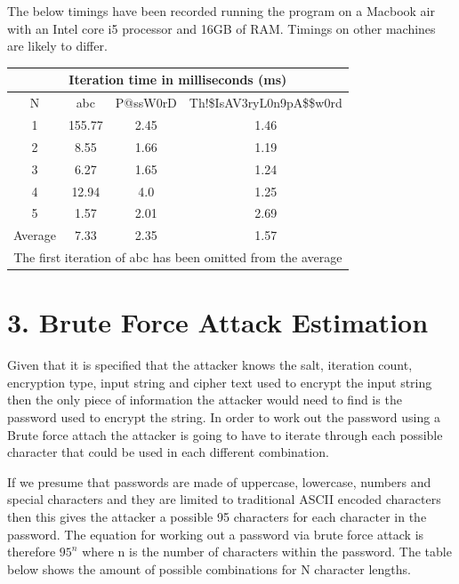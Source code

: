\documentclass[a4paper, twoside, 11pt]{article}
\begin{document}
 The below timings have been recorded running the program on a Macbook air with an Intel core i5 processor and 16GB of RAM.
  Timings on other machines are likely to differ.
 \begin{center}
	\begin{tabular}{ |c|c|c|c| } 
	 \hline
	 \multicolumn{4}{|c|}{Iteration time in milliseconds (ms)} \\
	 \hline
	 N & abc & P@ssW0rD & Th!\$IsAV3ryL0n9pA\$\$w0rd \\
	 \hline
	 1 & 155.77 & 2.45 & 1.46 \\ 
	 2 & 8.55 & 1.66 & 1.19  \\ 
	 3 & 6.27 & 1.65 & 1.24  \\ 
	 4 & 12.94 & 4.0 & 1.25 \\
	 5 & 1.57 & 2.01 & 2.69  \\
	 \hline
	 \hline
	 Average & 7.33 & 2.35 & 1.57  \\
	 \hline
	 \multicolumn{4}{|c|}{The first iteration of abc has been omitted from the average} \\
	 \hline
	\end{tabular}
\end{center}

\section*{3. Brute Force Attack Estimation}
Given that it is specified that the attacker knows the salt, iteration count, encryption type, 
input string and cipher text used to encrypt the input string then the only piece of information 
the attacker would need to find is the password used to encrypt the string. 
In order to work out the password using a Brute force attach the attacker is going to have to 
iterate through each possible character that could be used in each different combination.

If we presume that passwords are made of uppercase, lowercase, numbers and special characters and they are
limited to traditional ASCII encoded characters then this gives the attacker a possible 95 characters for each character in the password.
The equation for working out a password via brute force attack is therefore $95^n$ where n is the number of characters within the password.
The table below shows the amount of possible combinations for N character lengths.
\end{document}
